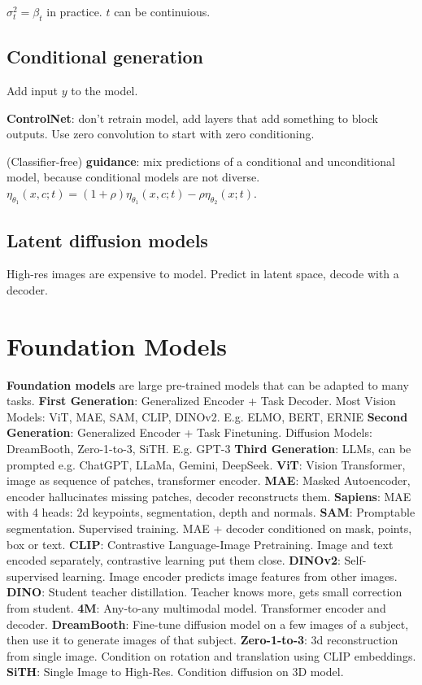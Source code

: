 \documentclass[11pt,landscape,a4paper,fleqn]{article}
\begin{document}
\begin{multicols*}{4}
$\sigma_t^2 = \beta_t$ in practice.
$t$ can be continuious.

\subsection{Conditional generation}

Add input $y$ to the model.

\textbf{ControlNet}: don't retrain model, add layers that add something to block outputs. 
Use zero convolution to start with zero conditioning.

(Classifier-free) \textbf{guidance}: mix predictions of a conditional and unconditional model,
because conditional models are not diverse.
$\eta_{\theta_1}(x, c; t) = (1 + \rho)\eta_{\theta_1}(x, c; t) - \rho \eta_{\theta_2}(x; t)$.

\subsection{Latent diffusion models}

High-res images are expensive to model.
Predict in latent space, decode with a decoder.

\section{Foundation Models}
\textbf{Foundation models} are large pre-trained models that can be adapted to many tasks.
\textbf{First Generation}: Generalized Encoder + Task Decoder. Most Vision Models: ViT, MAE, SAM, CLIP, DINOv2. E.g. ELMO, BERT, ERNIE
\textbf{Second Generation}: Generalized Encoder + Task Finetuning. Diffusion Models: DreamBooth, Zero-1-to-3, SiTH. E.g. GPT-3
\textbf{Third Generation}: LLMs, can be prompted e.g. ChatGPT, LLaMa, Gemini, DeepSeek.
\textbf{ViT}: Vision Transformer, image as sequence of patches, transformer encoder.
\textbf{MAE}: Masked Autoencoder, encoder hallucinates missing patches, decoder reconstructs them.
\textbf{Sapiens}: MAE with 4 heads: 2d keypoints, segmentation, depth and normals.
\textbf{SAM}: Promptable segmentation. Supervised training. MAE + decoder conditioned on mask, points, box or text.
\textbf{CLIP}: Contrastive Language-Image Pretraining. Image and text encoded separately, contrastive learning put them close.
\textbf{DINOv2}: Self-supervised learning. Image encoder predicts image features from other images.
\textbf{DINO}: Student teacher distillation. Teacher knows more, gets small correction from student.
\textbf{4M}: Any-to-any multimodal model. Transformer encoder and decoder.
\textbf{DreamBooth}: Fine-tune diffusion model on a few images of a subject, then use it to generate images of that subject.
\textbf{Zero-1-to-3}: 3d reconstruction from single image. Condition on rotation and translation using CLIP embeddings.
\textbf{SiTH}: Single Image to High-Res. Condition diffusion on 3D model.

\end{multicols*}
\end{document}
